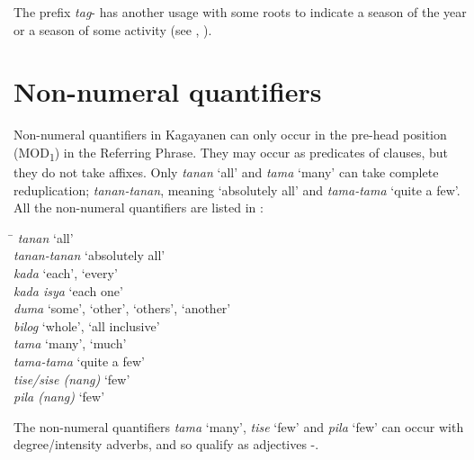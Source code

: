 The prefix \textit{tag}{}- has another usage with some roots to indicate a season of the year or a season of some activity (see , ).
  

\section{Non-numeral quantifiers}
\label{bkm:Ref52774536} \label{sec:non-numeralquantifiers} 

Non-numeral quantifiers in Kagayanen can only occur in the pre-head position (MOD\textsubscript{1}) in the Referring Phrase. They may occur as predicates of clauses, but they do not take affixes. Only \textit{tanan} ‘all’ and \textit{tama} ‘many’ can take complete reduplication; \textit{tanan-tanan}, meaning ‘absolutely all’ and \textit{tama-tama} ‘quite a few’. All the non-numeral quantifiers are listed in :

\ea
\label{bkm:Ref424336114}
\begin{tabbing}
\hspace{3cm} \= \kill
\textit{tanan                        } \>   ‘all’ \\
\textit{tanan-tanan                  } \>  ‘absolutely all’ \\
\textit{kada                         } \>  ‘each’, ‘every’ \\
\textit{kada isya                    } \>  ‘each one’ \\
\textit{duma                         } \>   ‘some’, ‘other’, ‘others’, ‘another’ \\
\textit{bilog                         } \>   ‘whole’, ‘all inclusive’ \\
\textit{tama                          } \>  ‘many’, ‘much’ \\
\textit{tama-tama                      } \>    ‘quite a few’ \\
\textit{tise/sise (nang) }\footnotemark \>  ‘few’ \\
\textit{pila (nang)                 } \>  ‘few’
\end{tabbing}
\z
The non-numeral quantifiers \textit{tama} ‘many’, \textit{tise} ‘few’ and \textit{pila} ‘few’ can occur with degree/intensity adverbs, and so qualify as adjectives -.

